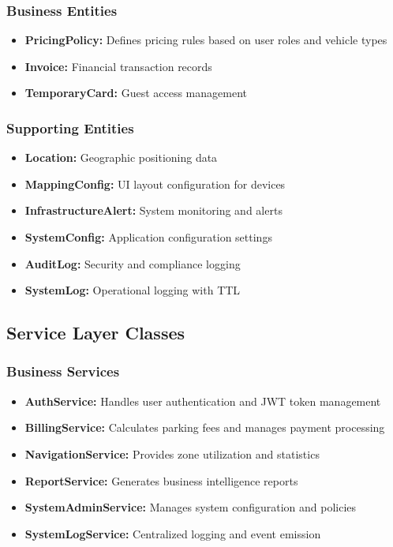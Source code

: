 \subsubsection{Business Entities}
\begin{itemize}
\item \textbf{PricingPolicy:} Defines pricing rules based on user roles and vehicle types
\item \textbf{Invoice:} Financial transaction records
\item \textbf{TemporaryCard:} Guest access management
\end{itemize}

\subsubsection{Supporting Entities}
\begin{itemize}
\item \textbf{Location:} Geographic positioning data
\item \textbf{MappingConfig:} UI layout configuration for devices
\item \textbf{InfrastructureAlert:} System monitoring and alerts
\item \textbf{SystemConfig:} Application configuration settings
\item \textbf{AuditLog:} Security and compliance logging
\item \textbf{SystemLog:} Operational logging with TTL
\end{itemize}

\subsection{Service Layer Classes}

\subsubsection{Business Services}
\begin{itemize}
\item \textbf{AuthService:} Handles user authentication and JWT token management
\item \textbf{BillingService:} Calculates parking fees and manages payment processing
\item \textbf{NavigationService:} Provides zone utilization and statistics
\item \textbf{ReportService:} Generates business intelligence reports
\item \textbf{SystemAdminService:} Manages system configuration and policies
\item \textbf{SystemLogService:} Centralized logging and event emission
\end{itemize}

